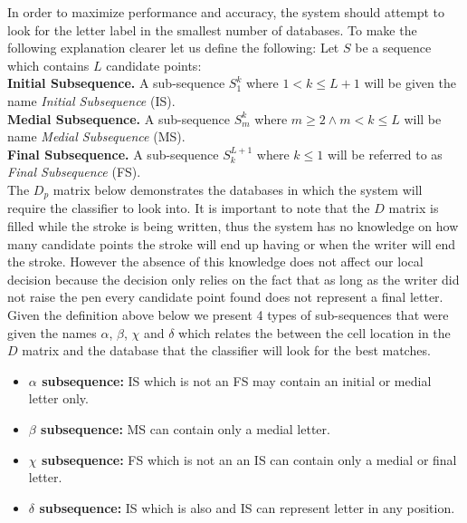 \documentclass[journal,compsoc]{IEEEtran}
\begin{document}
In order to maximize performance and accuracy, the system should attempt to look for the letter label in the smallest number of databases. 
To make the following explanation clearer let us define the following: 
Let $S$ be a sequence which contains $L$ candidate points:\\
\textbf{Initial Subsequence.} A sub-sequence $S_1^k$ where $ 1< k \leq L+1$ will be given the name \emph{Initial Subsequence} (IS).\\
\textbf{Medial Subsequence.} A sub-sequence $S_m^k$ where $m \geq 2 \wedge m< k \leq L$ will be name \emph{Medial Subsequence} (MS).\\
\textbf{Final Subsequence.} A sub-sequence $S_k^{L+1}$ where $k \leq 1$ will be referred to as \emph{Final Subsequence} (FS).\\

The $D_p$ matrix below demonstrates the databases in which the system will require the classifier to look into. It is important to note that the $D$ matrix is filled while the stroke is being written, thus the system has no knowledge on how many candidate points the stroke will end up having or when the writer will end the stroke. However the absence of this knowledge does not affect our local decision because the decision only relies on the fact that as long as the writer did not raise the pen every candidate point found does not represent a final letter. Given the definition above below we present 4 types of sub-sequences that were given the names $\alpha$, $\beta$, $\chi$ and $\delta$ which relates the between the cell location in the $D$ matrix and the database that the classifier will look for the best matches.
\begin{itemize}
	\item \textbf{$\alpha$ subsequence:} IS which is not an FS may contain an initial or medial letter only.
	\item \textbf{$\beta$ subsequence:} MS can contain only a medial letter.
	\item \textbf{$\chi$ subsequence:} FS which is not an an IS can contain only a medial or final letter.
	\item \textbf{$\delta$ subsequence:} IS which is also and IS can represent letter in any position.
\end{itemize}
\end{document}
